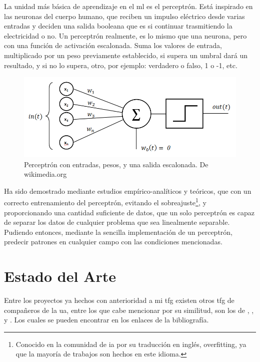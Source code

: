 La unidad más básica de aprendizaje en el \gls{ml} es el perceptrón. Está inspirado en las neuronas del cuerpo humano, que reciben un impulso eléctrico desde varias entradas y deciden una salida booleana que es si continuar trasmitiendo la electricidad o no. 
Un perceptrón realmente, es lo mismo que una neurona, pero con una función de activación escalonada. Suma los valores de entrada, multiplicado por un peso previamente establecido, si supera un umbral dará un resultado, y si no lo supera, otro, por ejemplo: verdadero o falso, 1 o -1, etc.

\begin{figure}[h]
	\centering
	\includegraphics[width=15cm]{archivos/imagenes/perceptron.png}
	\caption{Perceptrón con entradas, pesos, y una salida escalonada. De wikimedia.org}
\end{figure}

Ha sido demostrado mediante estudios empírico-analíticos y teóricos, que con un correcto entrenamiento del perceptrón, evitando el sobreajuste\footnote{Conocido en la comunidad de \gls{ia} por su traducción en inglés, overfitting, ya que la mayoría de trabajos son hechos en este idioma.}, y proporcionando una cantidad suficiente de datos, que un solo perceptrón es capaz de separar los datos de cualquier problema que sea linealmente separable. Pudiendo entonces, mediante la sencilla implementación de un perceptrón, predecir patrones en cualquier campo con las condiciones mencionadas.

\section{Estado del Arte}
Entre los proyectos ya hechos con anterioridad a mi \gls{tfg} existen otros \gls{tfg} de compañeros de la \gls{ua}, entre los que cabe mencionar por su similitud, son los de \cite{tfg-ia-1}, \cite{tfg-ia-2}, \cite{tfg-ia-3} y \cite{tfg-ia-4}. Los cuales se pueden encontrar en los enlaces de la bibliografía.

